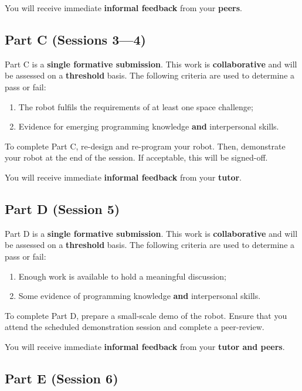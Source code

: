 \documentclass{fal_assignment}
\begin{document}
You will receive immediate \textbf{informal feedback} from your \textbf{peers}.

\subsection*{Part C (Sessions 3---4)}

Part C is a \textbf{single formative submission}. This work is \textbf{collaborative} and will be assessed on a \textbf{threshold} basis. The following criteria are used to determine a pass or fail:

\begin{enumerate}[label=(\alph*)]
	\item The robot fulfils the requirements of at least one space challenge;
	\item Evidence for emerging programming knowledge \textbf{and} interpersonal skills.
\end{enumerate}

To complete Part C, re-design and re-program your robot. Then, demonstrate your robot at the end of the session.  If acceptable, this will be signed-off.

You will receive immediate \textbf{informal feedback} from your \textbf{tutor}.

\subsection*{Part D (Session 5)}

Part D is a \textbf{single formative submission}. This work is \textbf{collaborative} and will be assessed on a \textbf{threshold} basis.  The following criteria are used to determine a pass or fail:

\begin{enumerate}[label=(\alph*)]
	\item Enough work is available to hold a meaningful discussion;
	\item Some evidence of programming knowledge \textbf{and} interpersonal skills.
\end{enumerate}

To complete Part D, prepare a small-scale demo of the robot. Ensure that you attend the scheduled demonstration session and complete a peer-review.

You will receive immediate \textbf{informal feedback} from your \textbf{tutor and peers}.

\subsection*{Part E (Session 6)}
\end{document}
